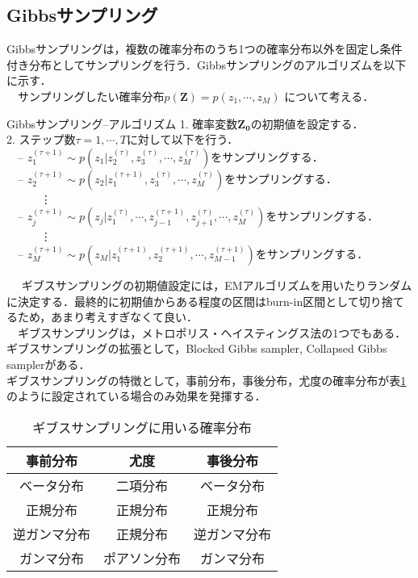 \documentclass[11pt, a4paper]{jarticle}
\begin{document}
\subsection{Gibbsサンプリング}
Gibbsサンプリングは，複数の確率分布のうち1つの確率分布以外を固定し条件付き分布としてサンプリングを行う．Gibbsサンプリングのアルゴリズムを以下に示す．\\
　サンプリングしたい確率分布$p(\bm{Z}) = p(z_1, \cdots, z_M)$ について考える．
\begin{itembox}[c]{Gibbsサンプリング--アルゴリズム}
  	1.  確率変数$\bm{Z_{0}}$の初期値を設定する．\\ 
	2. ステップ数$\tau = 1, \cdots, T$に対して以下を行う．\\
	　-- $z_{1}^{(\tau+1)} \sim p(z_{1} | z_{2}^{(\tau)}, z_{3}^{(\tau)}, \cdots, z_{M}^{(\tau)})$をサンプリングする．\\ 
	　-- $z_{2}^{(\tau+1)} \sim p(z_{2} | z_{1}^{(\tau+1)}, z_{3}^{(\tau)}, \cdots, z_{M}^{(\tau)})$をサンプリングする．\\
	　　　\vdots \\
	　-- $z_{j}^{(\tau+1)} \sim p(z_{j} | z_{1}^{(\tau)}, \cdots, z_{j-1}^{(\tau+1)}, z_{j+1}^{(\tau)}, \cdots, z_{M}^{(\tau)})$をサンプリングする．\\
	　　　\vdots \\
	　-- $z_{M}^{(\tau+1)} \sim p(z_{M} | z_{1}^{(\tau+1)}, z_{2}^{(\tau+1)}, \cdots, z_{M-1}^{(\tau+1)})$をサンプリングする．
 \end{itembox}
　 ギブスサンプリングの初期値設定には，EMアルゴリズムを用いたりランダムに決定する．最終的に初期値からある程度の区間はburn-in区間として切り捨てるため，あまり考えすぎなくて良い．\\ 
　ギブスサンプリングは，メトロポリス・ヘイスティングス法の1つでもある．ギブスサンプリングの拡張として，Blocked Gibbs sampler,  Collapsed Gibbs samplerがある．\\
ギブスサンプリングの特徴として，事前分布，事後分布，尤度の確率分布が表\ref{tab:gibbs}のように設定されている場合のみ効果を発揮する．
\begin{table}[h]
	\begin{center}
    	\caption{ギブスサンプリングに用いる確率分布}
    	\begin{tabular}{|c|c|c|} \hline
      	事前分布       & 尤度              & 事後分布 \\ \hline \hline
      	ベータ分布    & 二項分布       & ベータ分布 \\ \hline
      	正規分布        & 正規分布       & 正規分布 \\ \hline
	逆ガンマ分布 & 正規分布       & 逆ガンマ分布 \\ \hline
	ガンマ分布    & ポアソン分布 & ガンマ分布 \\ \hline
    	\end{tabular}
	\label{tab:gibbs}
  	\end{center}
\end{table}
\end{document}
